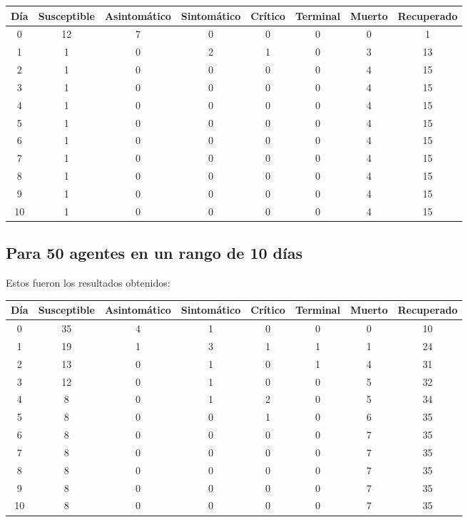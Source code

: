     \begin{center}
    \begin{tabular}{|c|c|c|c|c|c|c|c|}
    \hline
    Día & Susceptible & Asintomático & Sintomático & Crítico & Terminal & Muerto & Recuperado \\
    \hline
    0 & 12 & 7 & 0 & 0 & 0 & 0 & 1 \\
    1 & 1 & 0 & 2 & 1 & 0 & 3 & 13 \\
    2 & 1 & 0 & 0 & 0 & 0 & 4 & 15 \\
    3 & 1 & 0 & 0 & 0 & 0 & 4 & 15 \\
    4 & 1 & 0 & 0 & 0 & 0 & 4 & 15 \\
    5 & 1 & 0 & 0 & 0 & 0 & 4 & 15 \\
    6 & 1 & 0 & 0 & 0 & 0 & 4 & 15 \\
    7 & 1 & 0 & 0 & 0 & 0 & 4 & 15 \\
    8 & 1 & 0 & 0 & 0 & 0 & 4 & 15 \\
    9 & 1 & 0 & 0 & 0 & 0 & 4 & 15 \\
    10 & 1 & 0 & 0 & 0 & 0 & 4 & 15 \\
    \hline
    \end{tabular}
    \end{center}
    
    \subsection{Para 50 agentes en un rango de 10 días}
    Estos fueron los resultados obtenidos:
    
    \begin{center}
    \begin{tabular}{|c|c|c|c|c|c|c|c|}
    \hline
    Día & Susceptible & Asintomático & Sintomático & Crítico & Terminal & Muerto & Recuperado \\
    \hline
    0 & 35 & 4 & 1 & 0 & 0 & 0 & 10 \\
    1 & 19 & 1 & 3 & 1 & 1 & 1 & 24 \\
    2 & 13 & 0 & 1 & 0 & 1 & 4 & 31 \\
    3 & 12 & 0 & 1 & 0 & 0 & 5 & 32 \\
    4 & 8 & 0 & 1 & 2 & 0 & 5 & 34 \\
    5 & 8 & 0 & 0 & 1 & 0 & 6 & 35 \\
    6 & 8 & 0 & 0 & 0 & 0 & 7 & 35 \\
    7 & 8 & 0 & 0 & 0 & 0 & 7 & 35 \\
    8 & 8 & 0 & 0 & 0 & 0 & 7 & 35 \\
    9 & 8 & 0 & 0 & 0 & 0 & 7 & 35 \\
    10 & 8 & 0 & 0 & 0 & 0 & 7 & 35 \\
    \hline
    \end{tabular}
    \end{center}
    
